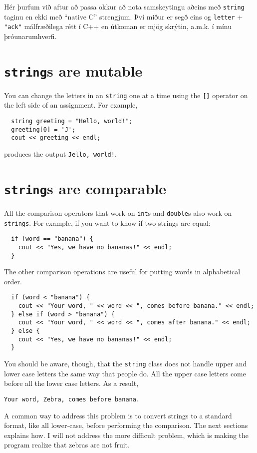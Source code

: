 Hér þurfum við aftur að passa okkur að nota samskeytingu aðeins með {\tt string} taginu en ekki með ``native C'' strengjum.
Því miður er segð eins og {\tt letter} + \verb+"ack"+ málfræðilega rétt í C++ en útkoman er mjög skrýtin, a.m.k. í mínu þróunarumhverfi.

\section{{\tt string}s are mutable}

You can change the letters in an {\tt string} one at a time
using the {\tt []} operator on the left side of an assignment.
For example,

\begin{verbatim}
  string greeting = "Hello, world!";
  greeting[0] = 'J';
  cout << greeting << endl;
\end{verbatim}
%
produces the output {\tt Jello, world!}.


\section{{\tt string}s are comparable}
\label{incomparable}

All the comparison operators that work on {\tt int}s and
{\tt double}s also work on {\tt strings}.  For example,
if you want to know if two strings are equal:

\begin{verbatim}
  if (word == "banana") {
    cout << "Yes, we have no bananas!" << endl;
  }
\end{verbatim}
%
The other comparison operations are useful for putting words
in alphabetical order.

\begin{verbatim}
  if (word < "banana") {
    cout << "Your word, " << word << ", comes before banana." << endl;
  } else if (word > "banana") {
    cout << "Your word, " << word << ", comes after banana." << endl;
  } else {
    cout << "Yes, we have no bananas!" << endl;
  }
\end{verbatim}
%
You should be aware, though, that the {\tt string} class does
not handle upper and lower case letters the same way that people
do.  All the upper case letters come before all the lower case
letters.  As a result,

\begin{verbatim}
Your word, Zebra, comes before banana.
\end{verbatim}
%
A common way to address this problem is to convert strings to a
standard format, like all lower-case, before performing the
comparison.  The next sections explains how.  I will not address the
more difficult problem, which is making the program realize that
zebras are not fruit.

